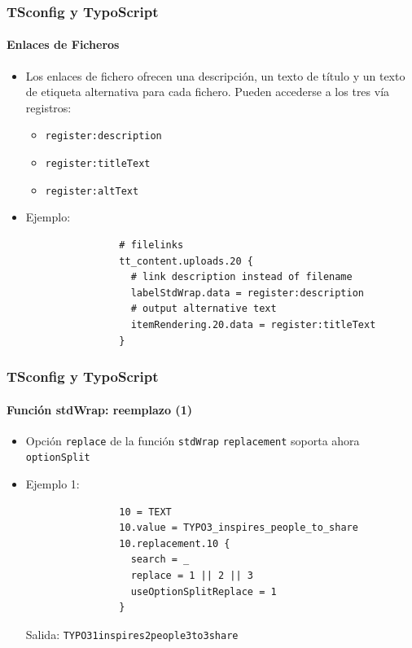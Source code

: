 \begin{frame}[fragile]
	\frametitle{TSconfig y TypoScript}
	\framesubtitle{Enlaces de Ficheros}

	\begin{itemize}
		\item Los enlaces de fichero ofrecen una descripción, un texto de título y un texto de etiqueta alternativa para cada fichero.
			Pueden accederse a los tres vía registros:

			\begin{itemize}
				\item \texttt{register:description}
				\item \texttt{register:titleText}
				\item \texttt{register:altText}
			\end{itemize}

		\item Ejemplo:

			\begin{lstlisting}
				# filelinks
				tt_content.uploads.20 {
				  # link description instead of filename
				  labelStdWrap.data = register:description
				  # output alternative text
				  itemRendering.20.data = register:titleText
				}
			\end{lstlisting}

	\end{itemize}

\end{frame}


\begin{frame}[fragile]
	\frametitle{TSconfig y TypoScript}
	\framesubtitle{Función stdWrap: reemplazo (1)}

	\begin{itemize}
		\item Opción \texttt{replace} de la función \texttt{stdWrap} \texttt{replacement}\newline
			soporta ahora \texttt{optionSplit}

		\item Ejemplo 1:

			\begin{lstlisting}
				10 = TEXT
				10.value = TYPO3_inspires_people_to_share
				10.replacement.10 {
				  search = _
				  replace = 1 || 2 || 3
				  useOptionSplitReplace = 1
				}
			\end{lstlisting}

			Salida:\newline
				\texttt{TYPO31inspires2people3to3share}

	\end{itemize}

\end{frame}

